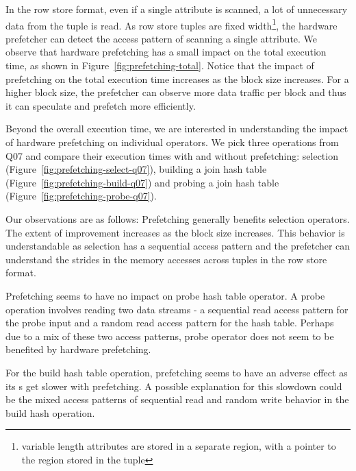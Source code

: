 In the row store format, even if a single attribute is scanned, a lot of unnecessary data from the tuple is read.
As row store tuples are fixed width\footnote{variable length attributes are stored in a separate region, with a pointer to the region stored in the tuple}, the hardware prefetcher can detect the access pattern of scanning a single attribute. 
We observe that hardware prefetching has a small impact on the total execution time, as shown in Figure~\ref{fig:prefetching-total}. 
Notice that the impact of prefetching on the total execution time increases as the block size increases. 
For a higher block size, the prefetcher can observe more data traffic per block and thus it can speculate and prefetch more efficiently. 

Beyond the overall execution time, we are interested in understanding the impact of hardware prefetching on individual operators. 
We pick three operations from Q07 and compare their execution times with and without prefetching: selection (Figure~\ref{fig:prefetching-select-q07}), building a join hash table (Figure~\ref{fig:prefetching-build-q07}) and probing a join hash table (Figure~\ref{fig:prefetching-probe-q07}).

Our observations are as follows:
Prefetching generally benefits selection operators. 
The extent of improvement increases as the block size increases. 
This behavior is understandable as selection has a sequential access pattern and the prefetcher can understand the strides in the memory accesses across tuples in the row store format.

Prefetching seems to have no impact on probe hash table operator.
A probe operation involves reading two data streams - a sequential read access pattern for the probe input and a random read access pattern for the hash table. 
Perhaps due to a mix of these two access patterns, probe operator does not seem to be benefited by hardware prefetching. 

For the build hash table operation, prefetching seems to have an adverse effect as its \wo{}s get slower with prefetching.
A possible explanation for this slowdown could be the mixed access patterns of sequential read and random write behavior in the build hash operation.

